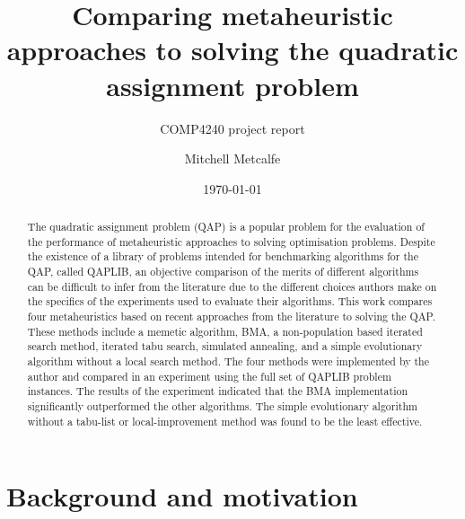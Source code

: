


\title{Comparing metaheuristic approaches to solving the quadratic assignment problem}
\subtitle{COMP4240 project report}
\author{Mitchell Metcalfe}

\date{\today}




  \maketitle

 \begin{abstract}

    The quadratic assignment problem (QAP) is a popular problem for the evaluation of the performance of metaheuristic approaches to solving optimisation problems.
    Despite the existence of a library of problems intended for benchmarking algorithms for the QAP, called QAPLIB, an objective comparison of the merits of different algorithms can be difficult to infer from the literature due to the different choices authors make on the specifics of the experiments used to evaluate their algorithms.
    This work compares four metaheuristics based on recent approaches from the literature to solving the QAP.
    These methods include a memetic algorithm, BMA, a non-population based iterated search method, iterated tabu search, simulated annealing, and a simple evolutionary algorithm without a local search method.
    The four methods were implemented by the author and compared in an experiment using the full set of QAPLIB problem instances.
    The results of the experiment indicated that the BMA implementation significantly outperformed the other algorithms.
    The simple evolutionary algorithm without a tabu-list or local-improvement method was found to be the least effective.

 \end{abstract}

  \newpage

  \section{Background and motivation} {
     \label{sec:introduction}
     
   }

